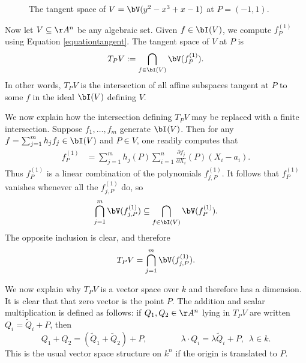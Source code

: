 \documentclass[12pt]{amsart}
\theoremstyle{plain}
\begin{document}
\begin{figure}[h]
\centering
{}
\caption{The tangent space of $V = \bV(y^2 - x^3 + x - 1)$ at $P=(-1, 1)$.}
\label{figure:tangentspace}
\end{figure}

Now let $V\subseteq\AA^n$ be any algebraic set.
Given $f\in\bI(V)$, we compute $f_P^{(1)}$ using Equation \ref{equationtangent}.
The tangent space of $V$ at $P$ is
$$T_PV := \bigcap_{f\in\bI(V)} \bV(f_P^{(1)}).$$
In other words, $T_PV$ is the intersection of all affine subspaces tangent at $P$ to some $f$ in the ideal $\bI(V)$ defining $V$.

We now explain how the intersection defining $T_PV$ may be replaced with a finite intersection.
Suppose $f_1, \ldots, f_m$ generate $\bI(V)$.
Then for any $f = \sum_{j=1}^m h_j f_j \in \bI(V)$ and $P \in V$, one readily computes that
\begin{align*}
	f_P^{(1)} &= \sum_{j=1}^m h_j(P) \sum_{i=1}^n \frac{\partial f_j}{\partial X_i}(P)(X_i-a_i).
\end{align*}
Thus $f_P^{(1)}$ is a linear combination of the polynomials $f_{j,P}^{(1)}$.
It follows that $f_P^{(1)}$ vanishes whenever all the $f_{j,P}^{(1)}$ do, so
$$\bigcap_{j=1}^m \bV(f_{j,P}^{(1)}) \subseteq \bigcap_{f \in \bI(V)} \bV(f_P^{(1)}).$$
The opposite inclusion is clear, and therefore
$$T_PV=\bigcap_{j=1}^m \bV(f_{j,P}^{(1)}).$$

We now explain why $T_PV$ is a vector space over $k$ and therefore has a dimension.
It is clear that that zero vector is the point $P$.
The addition and scalar multiplication is defined as follows: if $Q_1, Q_2 \in \AA^n$ lying in $T_PV$ are written $Q_i = \tilde Q_i + P$, then
$$Q_1 + Q_2 = (\tilde Q_1 + \tilde Q_2) + P, \qquad\qquad \lambda \cdot Q_i = \lambda \tilde Q_i + P, \,\,\, \lambda \in k.$$
This is the usual vector space structure on $k^n$ if the origin is translated to $P$.
\end{document}
